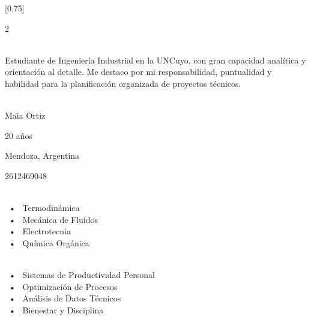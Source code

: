 \documentclass[lighthipster]{simplehipstercv}
\begin{document}
\setlength{\columnsep}{1.5cm}
[0.75]
\begin{paracol}{2}

\paracolbackgroundoptions



\footnotesize
{\setasidefontcolour
\flushright
\begin{center}
\end{center}

\\[0.5em]

{\footnotesize
Estudiante de Ingeniería Industrial en la UNCuyo, con gran capacidad analítica y orientación al detalle. Me destaco por mi responsabilidad, puntualidad y habilidad para la planificación organizada de proyectos técnicos.}
\bigskip

 \\[0.5em]
Maia Ortiz

20 años

Mendoza, Argentina

2612469048
\bigskip

 \\[0.5em]

 ~•~ Termodinámica \\
 ~•~ Mecánica de Fluidos \\
 ~•~ Electrotecnia \\
 ~•~ Química Orgánica \\

\bigskip



\bigskip

\\[0.5em]

~•~ Sistemas de Productividad Personal \\
~•~ Optimización de Procesos \\ 
~•~ Análisis de Datos Técnicos \\
~•~ Bienestar y Disciplina \\
\bigskip



}
\end{paracol}
\end{document}
